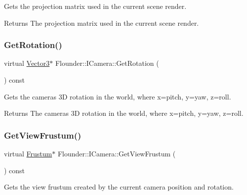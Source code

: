 Gets the projection matrix used in the current scene render. 

\begin{DoxyReturn}{Returns}
The projection matrix used in the current scene render. 
\end{DoxyReturn}
\mbox{\label{class_flounder_1_1_i_camera_ae2f71137c1450aae224755aa27ddbfe2}} 
\subsubsection{\texorpdfstring{Get\+Rotation()}{GetRotation()}}
{\footnotesize\ttfamily virtual \hyperlink{class_flounder_1_1_vector3}{Vector3}$\ast$ Flounder\+::\+I\+Camera\+::\+Get\+Rotation (\begin{DoxyParamCaption}{ }\end{DoxyParamCaption}) const\hspace{0.3cm}{\ttfamily [pure virtual]}}



Gets the cameras 3D rotation in the world, where x=pitch, y=yaw, z=roll. 

\begin{DoxyReturn}{Returns}
The cameras 3D rotation in the world, where x=pitch, y=yaw, z=roll. 
\end{DoxyReturn}
\mbox{\label{class_flounder_1_1_i_camera_a04001eaff8a7b5c24683ea29f52ead02}} 
\subsubsection{\texorpdfstring{Get\+View\+Frustum()}{GetViewFrustum()}}
{\footnotesize\ttfamily virtual \hyperlink{class_flounder_1_1_frustum}{Frustum}$\ast$ Flounder\+::\+I\+Camera\+::\+Get\+View\+Frustum (\begin{DoxyParamCaption}{ }\end{DoxyParamCaption}) const\hspace{0.3cm}{\ttfamily [pure virtual]}}



Gets the view frustum created by the current camera position and rotation. 

